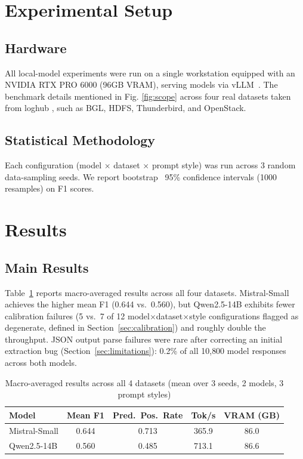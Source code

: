 \documentclass[10pt,conference]{IEEEtran}
\begin{document}
\section{Experimental Setup}
\subsection{Hardware}
All local-model experiments were run on a single workstation equipped with an NVIDIA RTX PRO 6000 (96GB VRAM), serving models via vLLM~\cite{vllm2023}. The benchmark details mentioned in Fig. \ref{fig:scope} across four real datasets taken from loghub \cite{loghub}, such as BGL, HDFS, Thunderbird, and OpenStack.

\subsection{Statistical Methodology}
Each configuration (model $\times$ dataset $\times$ prompt style) was run
across 3 random data-sampling seeds. We report bootstrap~\cite{efron1979bootstrap} 95\% confidence
intervals (1000 resamples) on F1 scores.

\section{Results}
\subsection{Main Results}

Table~\ref{tab:main-results} reports macro-averaged results across all
four datasets. Mistral-Small achieves the higher mean F1 (0.644 vs.\
0.560), but Qwen2.5-14B exhibits fewer calibration failures (5 vs.\ 7 of
12 model$\times$dataset$\times$style configurations flagged as degenerate,
defined in Section~\ref{sec:calibration}) and roughly double the
throughput. JSON output parse failures were rare after correcting an
initial extraction bug (Section~\ref{sec:limitations}): 0.2\% of all
10{,}800 model responses across both models.

\begin{table}[t]
\centering
\caption{Macro-averaged results across all 4 datasets (mean over 3 seeds, 2 models, 3 prompt styles)}
\label{tab:main-results}
\begin{tabular}{lcccc}
\toprule
Model & Mean F1 & Pred.\ Pos.\ Rate & Tok/s & VRAM (GB) \\
\midrule
Mistral-Small & 0.644 & 0.713 & 365.9 & 86.0 \\
Qwen2.5-14B   & 0.560 & 0.485 & 713.1 & 86.6 \\
\bottomrule
\end{tabular}
\end{table}
\end{document}
